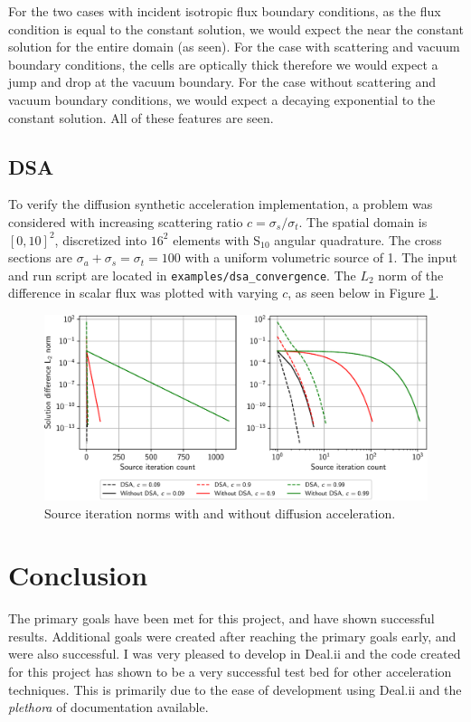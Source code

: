 \documentclass{article}
\begin{document}
For the two cases with incident isotropic flux boundary conditions, as the flux condition is equal to the constant solution, we would expect the near the constant solution for the entire domain (as seen). For the case with scattering and vacuum boundary conditions, the cells are optically thick therefore we would expect a jump and drop at the vacuum boundary. For the case without scattering and vacuum boundary conditions, we would expect a decaying exponential to the constant solution. All of these features are seen. 

\subsection{DSA}

To verify the diffusion synthetic acceleration implementation, a problem was considered with increasing scattering ratio $c = \sigma_s / \sigma_t$. The spatial domain is $[0, 10]^2$, discretized into $16^2$ elements with S$_{10}$ angular quadrature. The cross sections are $\sigma_a + \sigma_s = \sigma_t = 100$ with a uniform volumetric source of 1. The input and run script are located in \texttt{examples/dsa\_convergence}. The $L_2$ norm of the difference in scalar flux was plotted with varying $c$, as seen below in Figure \ref{fig:dsa}.

\begin{figure}[H]
	\centering
	\includegraphics[width=0.9\linewidth]{images/dsa_residuals}
	\caption{Source iteration norms with and without diffusion acceleration.}
	\label{fig:dsa}
\end{figure}

\section{Conclusion}

The primary goals have been met for this project, and have shown successful results. Additional goals were created after reaching the primary goals early, and were also successful. I was very pleased to develop in Deal.ii and the code created for this project has shown to be a very successful test bed for other acceleration techniques. This is primarily due to the ease of development using Deal.ii and the \textit{plethora} of documentation available.
\end{document}
